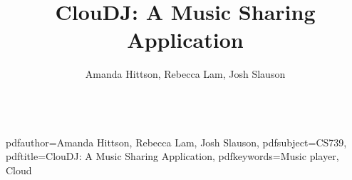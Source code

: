 \documentclass{sig-alternate}
\begin{document}
\hypersetup
{
    pdfauthor={Amanda Hittson, Rebecca Lam, Josh Slauson},
    pdfsubject={CS739},
    pdftitle={ClouDJ: A Music Sharing Application},
    pdfkeywords={Music player, Cloud}
}

\title{ClouDJ: A Music Sharing Application}

\author{
    \alignauthor Amanda Hittson, Rebecca Lam, Josh Slauson \\
        \\
}

\maketitle











\end{document}
